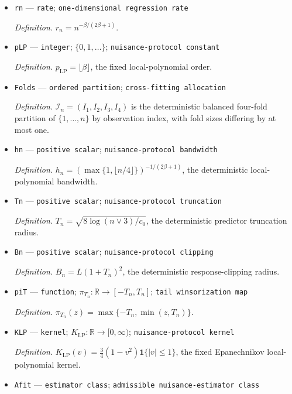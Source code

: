 \documentclass{article}
\begin{document}
\begin{itemize}
  \item \texttt{rn} --- \texttt{rate}; \texttt{one-\allowbreak{}dimensional regression rate}
  \par\smallskip\noindent\emph{Definition.} \(r_n=n^{-\beta/(2\beta+1)}\).
  \item \texttt{pLP} --- \texttt{integer}; \(\{0,1,\ldots\}\); \texttt{nuisance-\allowbreak{}protocol constant}
  \par\smallskip\noindent\emph{Definition.} \(p_{\mathrm{LP}}=\lfloor\beta\rfloor\), the fixed local-polynomial order.
  \item \texttt{Folds} --- \texttt{ordered partition}; \texttt{cross-\allowbreak{}fitting allocation}
  \par\smallskip\noindent\emph{Definition.} \(\mathcal I_n=(I_1,I_2,I_3,I_4)\) is the deterministic balanced four-fold partition of \(\{1,\ldots,n\}\) by observation index, with fold sizes differing by at most one.
  \item \texttt{hn} --- \texttt{positive scalar}; \texttt{nuisance-\allowbreak{}protocol bandwidth}
  \par\smallskip\noindent\emph{Definition.} \(h_n=(\max\{1,\lfloor n/4\rfloor\})^{-1/(2\beta+1)}\), the deterministic local-polynomial bandwidth.
  \item \texttt{Tn} --- \texttt{positive scalar}; \texttt{nuisance-\allowbreak{}protocol truncation}
  \par\smallskip\noindent\emph{Definition.} \(T_n=\sqrt{8\log(n\vee3)/c_0}\), the deterministic predictor truncation radius.
  \item \texttt{Bn} --- \texttt{positive scalar}; \texttt{nuisance-\allowbreak{}protocol clipping}
  \par\smallskip\noindent\emph{Definition.} \(B_n=L(1+T_n)^2\), the deterministic response-clipping radius.
  \item \texttt{piT} --- \texttt{function}; \(\pi_{T_n}:\mathbb R\to[-T_n,T_n]\); \texttt{tail winsorization map}
  \par\smallskip\noindent\emph{Definition.} \(\pi_{T_n}(z)=\max\{-T_n,\min(z,T_n)\}\).
  \item \texttt{KLP} --- \texttt{kernel}; \(K_{\mathrm{LP}}:\mathbb R\to[0,\infty)\); \texttt{nuisance-\allowbreak{}protocol kernel}
  \par\smallskip\noindent\emph{Definition.} \(K_{\mathrm{LP}}(v)=\tfrac34(1-v^2)\mathbf 1\{|v|\le1\}\), the fixed Epanechnikov local-polynomial kernel.
  \item \texttt{Afit} --- \texttt{estimator class}; \texttt{admissible nuisance-\allowbreak{}estimator class}

\end{itemize}
\end{document}
